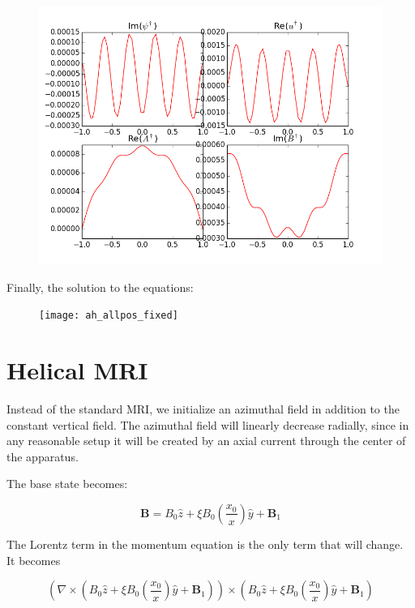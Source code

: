\documentclass[letterpaper,12pt]{article}
\newcommand{\beq}{\begin{equation}}
\newcommand{\eeq}{\end{equation}}
\begin{document}
\begin{figure}[h!]
\centering
\includegraphics[scale=0.5]{nonadjoint_redonly}
\end{figure}


Finally, the solution to the equations:

\begin{figure}[h!]
\centering
\texttt{[image: ah\_allpos\_fixed]}
\end{figure}


\pagebreak
\section*{Helical MRI}

Instead of the standard MRI, we initialize an azimuthal field in addition to the constant vertical field. The azimuthal field will linearly decrease radially, since in any reasonable setup it will be created by an axial current through the center of the apparatus.

The base state becomes:

\begin{equation}
\mathbf{B} = B_0 \hat{z} + \xi B_0 \left(\frac{x_0}{x}\right) \hat{y} + \mathbf{B}_1
\end{equation}

The Lorentz term in the momentum equation is the only term that will change. It becomes

\beq
\left(\nabla \times \left(B_0 \hat{z} + \xi B_0 \left(\frac{x_0}{x}\right) \hat{y} + \mathbf{B}_1
\right) \right) \times \left(B_0 \hat{z} + \xi B_0 \left(\frac{x_0}{x}\right) \hat{y} + \mathbf{B}_1
\right)
\eeq
\end{document}
